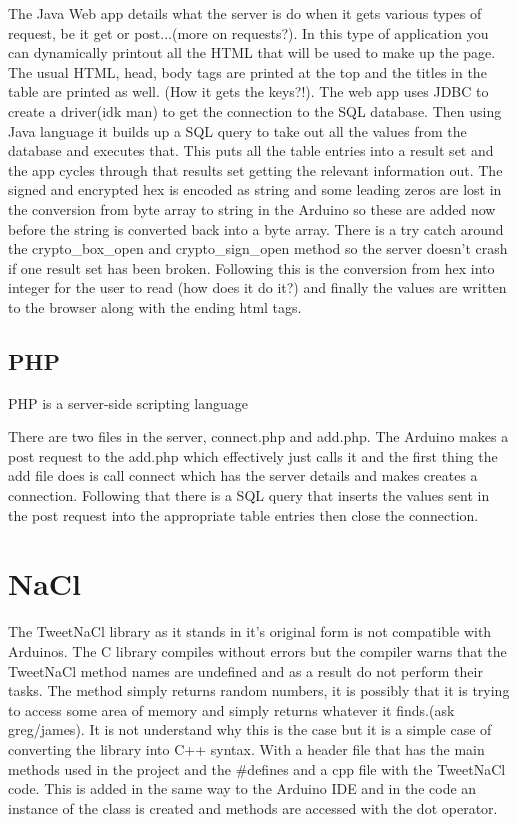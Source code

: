 The Java Web app details what the server is do when it gets various types of request, be it get or post...(more on requests?). In this type of application you can dynamically printout all the HTML that will be used to make up the page. The usual  HTML, head, body tags are printed at the top and the titles in the table are printed as well. (How it gets the keys?!). The web app uses JDBC to create a driver(idk man) to get the connection to the SQL database. Then using Java language it builds up a SQL query to take out all the values from the database and executes that. This puts all the table entries into a result set and the app cycles through that results set getting the relevant information out. The signed and encrypted hex is encoded as string and some leading zeros are lost in the conversion from byte array to string in the Arduino so these are added now before the string is converted back into a byte array. There is a try catch around the crypto\_box\_open and crypto\_sign\_open method so the server doesn't crash if one result set has been broken. Following this is the conversion from hex into integer for the user to read (how does it do it?) and finally the values are written to the browser along with the ending html tags.

\subsection{PHP}
PHP is a server-side scripting language 

There are two files in the server, connect.php and add.php. The Arduino makes a post request to the add.php which effectively just calls it and the first thing the add file does is call connect which has the server details and makes creates a connection. Following that there is a SQL query that inserts the values sent in the post request into the appropriate table entries then close the connection. 

\section{NaCl}

The TweetNaCl library as it stands in it's original form is not compatible with Arduinos. The C library compiles without errors but the compiler warns that the TweetNaCl method names are undefined and as a result do not perform their tasks. The method simply returns random numbers, it is possibly that it is trying to access some area of memory and simply returns whatever it finds.(ask greg/james). It is not understand why this is the case but it is a simple case of converting the library into C++ syntax. With a header file that has the main methods used in the project and the \#defines and a cpp file with the TweetNaCl code. This is added in the same way to the Arduino IDE and in the code an instance of the class is created and methods are accessed with the dot operator.

